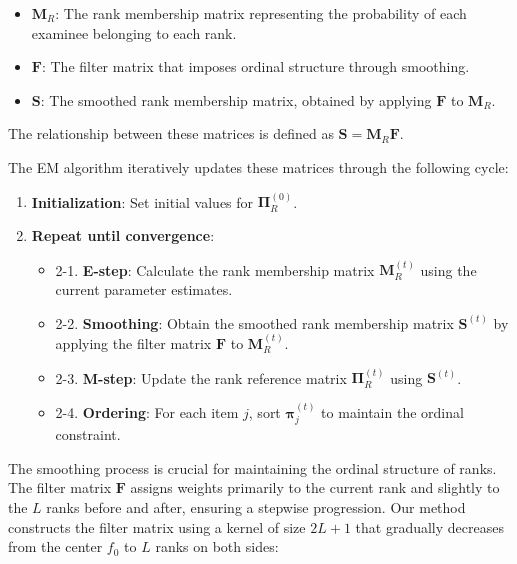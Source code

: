 \begin{itemize}
\tightlist
\item
  \(\mathbf{M}_R\): The rank membership matrix representing the probability of each examinee belonging to each rank.
\item
  \(\mathbf{F}\): The filter matrix that imposes ordinal structure through smoothing.
\item
  \(\mathbf{S}\): The smoothed rank membership matrix, obtained by applying \(\mathbf{F}\) to \(\mathbf{M}_R\).
\end{itemize}

The relationship between these matrices is defined as \(\mathbf{S} = \mathbf{M}_R \mathbf{F}\).

The EM algorithm iteratively updates these matrices through the following cycle:

\begin{enumerate}
\def\labelenumi{\arabic{enumi}.}
\tightlist
\item
  \textbf{Initialization}: Set initial values for \(\boldsymbol{\Pi}_R^{(0)}\).
\item
  \textbf{Repeat until convergence}:

  \begin{itemize}
  \tightlist
  \item
    2-1. \textbf{E-step}: Calculate the rank membership matrix \(\mathbf{M}_R^{(t)}\) using the current parameter estimates.
  \item
    2-2. \textbf{Smoothing}: Obtain the smoothed rank membership matrix \(\mathbf{S}^{(t)}\) by applying the filter matrix \(\mathbf{F}\) to \(\mathbf{M}_R^{(t)}\).
  \item
    2-3. \textbf{M-step}: Update the rank reference matrix \(\boldsymbol{\Pi}_R^{(t)}\) using \(\mathbf{S}^{(t)}\).
  \item
    2-4. \textbf{Ordering}: For each item \(j\), sort \(\boldsymbol{\pi}_j^{(t)}\) to maintain the ordinal constraint.
  \end{itemize}
\end{enumerate}

The smoothing process is crucial for maintaining the ordinal structure of ranks. The filter matrix \(\mathbf{F}\) assigns weights primarily to the current rank and slightly to the \(L\) ranks before and after, ensuring a stepwise progression. Our method constructs the filter matrix using a kernel of size \(2L+1\) that gradually decreases from the center \(f_0\) to \(L\) ranks on both sides:

